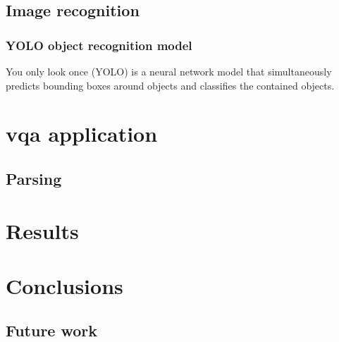 \documentclass[11pt,a4paper]{article}
\begin{document}
\subsection{Image recognition}

\subsubsection{YOLO object recognition model}

You only look once (YOLO) \citep{RedmonYouOnlyLook2015} is a neural network model that simultaneously predicts bounding boxes around objects and classifies the contained objects.

\section{\Gls{vqa} application}

\subsection{Parsing}

\section{Results}

\section{Conclusions}

\subsection{Future work}


\end{document}
